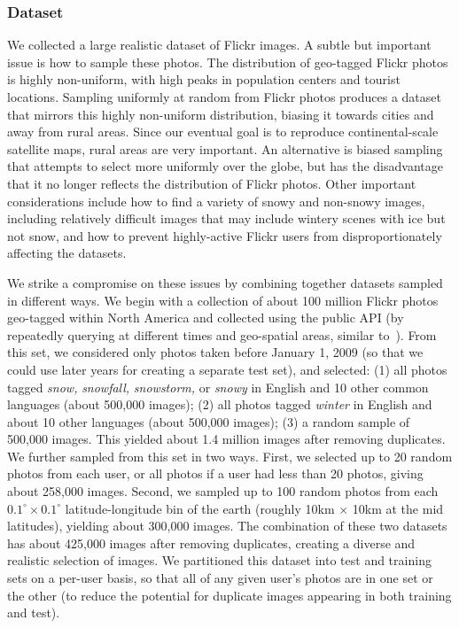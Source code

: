 %
\subsubsection*{Dataset}

We collected a large realistic dataset of Flickr images.
A subtle but important issue is how to sample
these photos. The distribution of geo-tagged Flickr photos is highly
non-uniform, with high peaks in population centers and tourist
locations.  Sampling uniformly at random from  Flickr photos
produces a dataset that mirrors this highly non-uniform distribution,
biasing it towards cities and away from rural areas. Since our
eventual goal is to reproduce continental-scale satellite maps, rural
areas are very important. An alternative is biased sampling that
attempts to select more uniformly over the globe, but has the
disadvantage that it no longer reflects the distribution of Flickr
photos. Other important considerations include how to find a variety
of snowy and non-snowy images, including relatively difficult images
that may include wintery scenes with ice but not snow, and how to
prevent highly-active Flickr users from disproportionately affecting
the datasets.

We strike a compromise on these issues by combining together datasets
sampled in different ways.  We begin with a collection of about 100
million Flickr photos geo-tagged within North America and collected
using the public API (by repeatedly querying at different times and
geo-spatial areas, similar to~\cite{hays}). From this set, we
considered only photos taken before January 1, 2009 (so that we could
use later years for creating a separate test set), and selected:
%
(1) all photos tagged \textit{snow,} \textit{snowfall,} \textit{snowstorm,} or \textit{snowy} in
  English and 10 other common languages (about 500,000 images);
(2) all photos tagged \textit{winter} in English and about 10 other languages (about 500,000 images);
(3) a random sample of 500,000 images.
%
This yielded about 1.4 million images after removing duplicates.  We
further sampled from this set in two ways. First, we selected up to 20
random photos from each user, or all photos if a user had less than 20
photos, giving about 258,000 images. Second, we sampled up to 100
random photos from each $0.1^\circ \times 0.1^\circ$
latitude-longitude bin of the earth (roughly 10km $\times$ 10km at the
mid latitudes), yielding about 300,000 images. The combination of
these two datasets has about 425,000 images after removing duplicates,
creating 
a diverse and realistic selection
of images.  We partitioned this dataset into test and training
sets on a per-user basis, so that all of any given user's photos are
in one set or the other  (to reduce the potential
for duplicate images appearing in both
training and test).

